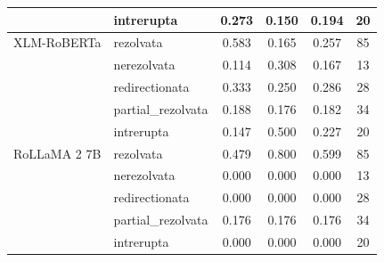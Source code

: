 \begin{table}[H]
\begin{tabular}{llcccc}
 & intrerupta & 0.273 & 0.150 & 0.194 & 20 \\
\midrule
XLM-RoBERTa & rezolvata & 0.583 & 0.165 & 0.257 & 85 \\
 & nerezolvata & 0.114 & 0.308 & 0.167 & 13 \\
 & redirectionata & 0.333 & 0.250 & 0.286 & 28 \\
 & partial\_rezolvata & 0.188 & 0.176 & 0.182 & 34 \\
 & intrerupta & 0.147 & 0.500 & 0.227 & 20 \\
\midrule
RoLLaMA 2 7B & rezolvata & 0.479 & 0.800 & 0.599 & 85 \\
 & nerezolvata & 0.000 & 0.000 & 0.000 & 13 \\
 & redirectionata & 0.000 & 0.000 & 0.000 & 28 \\
 & partial\_rezolvata & 0.176 & 0.176 & 0.176 & 34 \\
 & intrerupta & 0.000 & 0.000 & 0.000 & 20 \\
\bottomrule
\end{tabular}
\end{table}